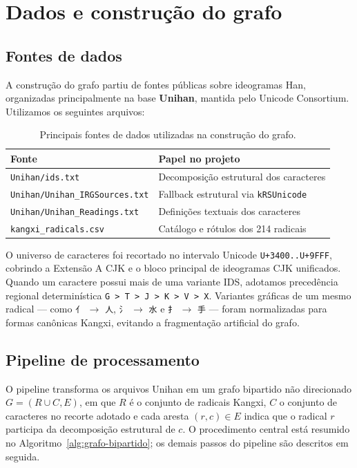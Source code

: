 \documentclass[10pt, a4paper, titlepage]{extarticle}
\begin{document}
\section{Dados e construção do grafo}
\subsection{Fontes de dados}
A construção do grafo partiu de fontes públicas sobre ideogramas Han, organizadas principalmente na base \textbf{Unihan}, mantida pelo Unicode Consortium. Utilizamos os seguintes arquivos:

\begin{table}[H]
\centering
\small
\renewcommand{\arraystretch}{1.2}
\begin{tabular}{p{4.8cm} p{7.8cm}}
\toprule
\textbf{Fonte} & \textbf{Papel no projeto} \\
\midrule
\texttt{Unihan/ids.txt} & Decomposição estrutural dos caracteres \\
\texttt{Unihan/Unihan\_IRGSources.txt} & Fallback estrutural via \texttt{kRSUnicode} \\
\texttt{Unihan/Unihan\_Readings.txt} & Definições textuais dos caracteres \\
\texttt{kangxi\_radicals.csv} & Catálogo e rótulos dos 214 radicais \\
\bottomrule
\end{tabular}
\caption{Principais fontes de dados utilizadas na construção do grafo.}
\label{tab:fontes-dados}
\end{table}

O universo de caracteres foi recortado no intervalo Unicode \texttt{U+3400..U+9FFF}, cobrindo a Extensão A CJK e o bloco principal de ideogramas CJK unificados. Quando um caractere possui mais de uma variante IDS, adotamos precedência regional determinística \texttt{G > T > J > K > V > X}. Variantes gráficas de um mesmo radical --- como \texttt{亻} $\rightarrow$ \texttt{人}, \texttt{氵} $\rightarrow$ \texttt{水} e \texttt{扌} $\rightarrow$ \texttt{手} --- foram normalizadas para formas canônicas Kangxi, evitando a fragmentação artificial do grafo.

\subsection{Pipeline de processamento}
O pipeline transforma os arquivos Unihan em um grafo bipartido não direcionado $G = (R \cup C, E)$, em que $R$ é o conjunto de radicais Kangxi, $C$ o conjunto de caracteres no recorte adotado e cada aresta $(r, c) \in E$ indica que o radical $r$ participa da decomposição estrutural de $c$. O procedimento central está resumido no Algoritmo~\ref{alg:grafo-bipartido}; os demais passos do pipeline são descritos em seguida.
\end{document}
